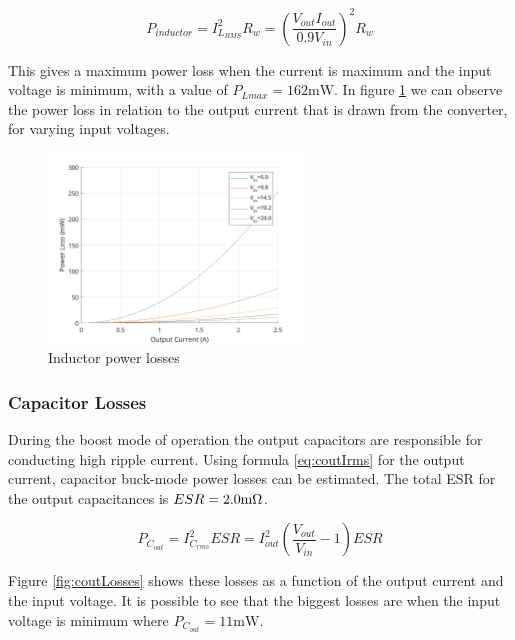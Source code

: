 \documentclass[11pt, a4paper]{article}
\begin{document}
\begin{equation}
    P_{inductor} = I_{L_{RMS}}^2 R_w = \left (\frac{V_{out}I_{out}}{0.9V_{in}} \right )^2 R_w
\end{equation}

This gives a maximum power loss when the current is maximum and the input voltage is minimum, with a value of $P_{Lmax} = 162\text{mW}$. In figure \ref{fig:inductorLosses} we can observe the power loss in relation to the output current that is drawn from the converter, for varying input voltages.

\begin{figure}[H]
    \centering
    \includegraphics[width=0.6\textwidth]{./figures/inductorLosses.png}
    \caption{Inductor power losses}
    \label{fig:inductorLosses}
\end{figure}

\subsubsection{Capacitor Losses}

During the boost mode of operation the output capacitors are responsible for conducting high ripple current. Using formula \ref{eq:coutIrms} for the output current, capacitor buck-mode power losses can be estimated. The total ESR for the output capacitances is $ESR = 2.0\text m \Omega$.

\begin{equation}
    P_{C_{out}} = I_{C_{rms}}^2 ESR = I_{out}^2 \left (\frac{V_{out}}{V_{in}} - 1 \right ) ESR
\end{equation}

Figure \ref{fig:coutLosses} shows these losses as a function of the output current and the input voltage. It is possible to see that the biggest losses are when the input voltage is minimum where $P_{C_{out}} = 11\text{mW}$.
\end{document}
